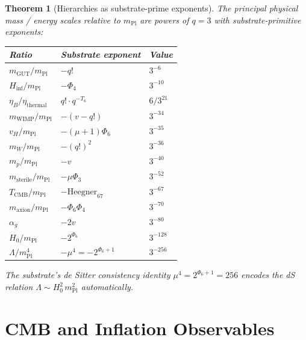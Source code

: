 \documentclass[11pt]{article}
\newtheorem{theorem}{Theorem}[section]
\newcommand{\mPl}{m_{\mathrm{Pl}}}
\begin{document}
\begin{theorem}[Hierarchies as substrate-prime exponents]\label{thm:ladder}
The principal physical mass / energy scales relative to $m_{\mathrm{Pl}}$
are powers of $q = 3$ with substrate-primitive exponents:

\begin{center}\small\begin{tabular}{lll}
\toprule
\textbf{Ratio} & \textbf{Substrate exponent} & \textbf{Value} \\
\midrule
$m_{\mathrm{GUT}}/\mPl$        & $-q!$                & $3^{-6}$ \\
$H_{\mathrm{inf}}/\mPl$        & $-\Phi_4$            & $3^{-10}$ \\
$\eta_B/\eta_{\mathrm{thermal}}$ & $q! \cdot q^{-T_6}$ & $6/3^{21}$ \\
$m_{\mathrm{WIMP}}/\mPl$       & $-(v - q!)$          & $3^{-34}$ \\
$v_H/\mPl$                      & $-(\mu+1)\Phi_6$    & $3^{-35}$ \\
$m_W/\mPl$                      & $-(q!)^2$            & $3^{-36}$ \\
$m_p/\mPl$                      & $-v$                  & $3^{-40}$ \\
$m_{\mathrm{sterile}}/\mPl$    & $-\mu\Phi_3$          & $3^{-52}$ \\
$T_{\mathrm{CMB}}/\mPl$        & $-\mathrm{Heegner}_{67}$ & $3^{-67}$ \\
$m_{\mathrm{axion}}/\mPl$      & $-\Phi_6\Phi_4$       & $3^{-70}$ \\
$\alpha_g$                       & $-2v$                  & $3^{-80}$ \\
$H_0/\mPl$                      & $-2^{\Phi_6}$         & $3^{-128}$ \\
$\Lambda/\mPl^4$                & $-\mu^4 = -2^{\Phi_6+1}$ & $3^{-256}$ \\
\bottomrule
\end{tabular}\end{center}

The substrate's de Sitter consistency identity
$\mu^4 = 2^{\Phi_6+1} = 256$ encodes the dS relation
$\Lambda \sim H_0^2\,\mPl^2$ automatically.
\end{theorem}

\section{CMB and Inflation Observables}\label{sec:cmb_observables}
\end{document}
